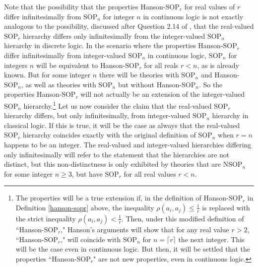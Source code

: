 \documentclass{amsart}
\theoremstyle{definition}
\theoremstyle{remark}
\numberwithin{equation}{section}
\begin{document}
Note that the possibility that the properties Hanson-$\mathrm{SOP}_{r}$ for real values of $r$ differ infinitesimally from $\mathrm{SOP}_{n}$ for integer $n$ in continuous logic is not exactly analogous to the possibility, discussed after Question 2.14 of \cite{ApproxOrder}, that the real-valued $\mathrm{SOP}_{r}$ hierarchy differs only infinitesimally from the integer-valued $\mathrm{SOP}_{n}$ hierarchy in discrete logic. In the scenario where the properties Hanson-$\mathrm{SOP}_{r}$ differ infinitesimally from integer-valued $\mathrm{SOP}_{n}$ in continuous logic, $\mathrm{SOP}_{n}$ for integers $n$ will be equivalent to Hanson-$\mathrm{SOP}_{r}$ for all reals $r < n$, as is already known. But for some integer $n$ there will be theories with $\mathrm{SOP}_{n}$ and Hanson-$\mathrm{SOP}_{n}$, as well as theories with $\mathrm{SOP}_{n}$ but without Hanson-$\mathrm{SOP}_{n}$. So the properties Hanson-$\mathrm{SOP}_{r}$ will not actually be an extension of the integer-valued $\mathrm{SOP}_{n}$ hierarchy.\footnote{The properties will be a true extension if, in the definition of Hanson-$\mathrm{SOP}_{r}$ in Definition \ref{hanson-sopr} above,  the inequality $\rho(a_{i}, a_{j})\leq \frac{1}{r}$ is replaced with the strict inequality $\rho(a_{i}, a_{j}) < \frac{1}{r}$. Then, under this modified definition of ``Hanson-$\mathrm{SOP}_{r}$," Hanson's arguments will show that for any real value $r > 2$, ``Hanson-$\mathrm{SOP}_{r}$," will coincide with $\mathrm{SOP}_{n}$ for $n=\lceil r \rceil$ the next integer. This will be the case even in continuous logic. But then, it will be settled that the properties ``Hanson-$\mathrm{SOP}_{r}$" are not new properties, even in continuous logic.} Let us now consider the claim that the real-valued $\mathrm{SOP}_{r}$ hierarchy differs, but only infinitesimally, from integer-valued $\mathrm{SOP}_{n}$ hierarchy in classical logic. If this is true, it will be the case as always that the real-valued $\mathrm{SOP}_{r}$ hierarchy coincides exactly with the original definition of $\mathrm{SOP}_{n}$ when $r = n$ happens to be an integer. The real-valued and integer-valued hierarchies differing only infinitesimally will refer to the statement that the hierarchies are not distinct, but this non-distinctness is only exhibited by theories that are $\mathrm{NSOP}_{n}$ for some integer $n \geq 3$, but have $\mathrm{SOP}_{r}$ for all real values $r < n$.








\end{document}
